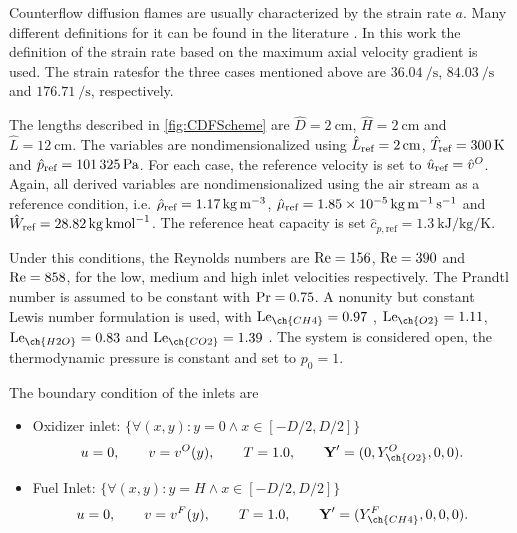Counterflow diffusion flames are usually characterized by the strain rate $a$. Many different definitions for it can be found in the literature \parencite{fialaNonpremixedCounterflowFlames2014}. In this work the definition of the strain rate based on the maximum axial velocity gradient is used. The strain ratesfor the three cases mentioned above are $\SI{36.04}{\per\second}$, $\SI{84.03}{\per\second}$ and $\SI{176.71}{\per\second}$, respectively. 


The lengths described in \cref{fig:CDFScheme} are $\hat D = \SI{2}{\centi\meter}$, $\hat H = \SI{2}{\centi\meter}$ and $\hat L = \SI{12}{\centi\meter}$. The variables are nondimensionalized using $\hat L_{\text{ref}} = \SI{2}{\centi\meter}$, $\hat T_{\text{ref}} = \SI{300}{\kelvin}$ and $\hat p_{\text{ref}} = \SI{101325}{\pascal}$.  For each case, the reference velocity is set to $\hat u_{\text{ref}} = \hat v^O$.  Again, all derived variables are nondimensionalized using the air stream as a reference condition, i.e. $\hat \rho_{\text{ref}} = \SI{1.17}{\kilo \gram \per \cubic \meter}$, $\hat \mu_{\text{ref}} = \SI{1.85e-5}{\kilo \gram \per \meter \per \second}$ and $\hat W_{\text{ref}} = \SI{28.82}{\kilo \gram \per \kilo\mole}$. The reference heat capacity is set $\hat{c}_{p,\text{ref}}= \SI{1.3}{\kilo \joule \per \kilo \gram \per \kelvin}$. 

Under this conditions, the Reynolds numbers are $\text{Re} = 156$, $\text{Re} = 390$ and $\text{Re} = 858$, for the low, medium and high inlet velocities respectively. The Prandtl number is assumed to be constant with $\text{Pr} = 0.75$. A nonunity but constant Lewis number formulation is used, with $\Lewis_{\ch{CH4}} =  0.97 $ , $\Lewis_{\ch{O2}} = 1.11 $, $\Lewis_{\ch{H2O}} = 0.83 $ and $\Lewis_{\ch{CO2}} = 1.39 $ \parencite{smookePremixedNonpremixedTest1991}. The system is considered open, the thermodynamic pressure is constant and set to $ p_0 = 1$. %


The boundary condition of the inlets are
\begin{itemize}
	\item Oxidizer inlet: $\{\forall (x,y): y = 0 \land x \in [-D/2, D/2]\}$\\
	\begin{equation*}
		u = 0,\qquad v= v^O(y), \qquad T = 1.0, \qquad \vec{Y}' = (0,Y^O_{\ch{O2}},0,0).
	\end{equation*}
	\item Fuel Inlet: $\{\forall (x,y): y = H \land x \in [-D/2, D/2]\} $ \\
	\begin{equation*}
		u = 0,\qquad v= v^F(y), \qquad T = 1.0, \qquad \vec{Y}' = (Y^F_{\ch{CH4}},0,0,0).
	\end{equation*}
\end{itemize}
 
